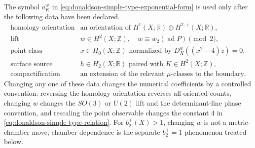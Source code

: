 \begin{definition}
\label{def:donaldson-simple-type-normalization-convention}
The symbol \(a_K^w\) in
\eqref{eq:donaldson-simple-type-exponential-form} is used only after the
following data have been declared.
\[
\begin{array}{ll}
  \text{homology orientation} &
  \text{an orientation of }H^1(X;\mathbb R)\oplus H^{2,+}(X;\mathbb R),\\[1mm]
  \text{lift} &
  w\in H^2(X;\mathbb Z),\quad w\equiv w_2(\operatorname{ad}P)\pmod2,\\[1mm]
  \text{point class} &
  x\in H_0(X;\mathbb Z)\text{ normalized by }D_X^w((x^2-4)z)=0,\\[1mm]
  \text{surface source} &
  h\in H_2(X;\mathbb R)\text{ paired with }K\in H^2(X;\mathbb Z),\\[1mm]
  \text{compactification} &
  \text{an extension of the relevant }\mu\text{-classes to the boundary.}
\end{array}
\]
Changing any one of these data changes the numerical coefficients by a
controlled convention: reversing the homology orientation reverses all
oriented counts, changing \(w\) changes the \(SO(3)\) or \(U(2)\) lift and
the determinant-line phase convention, and rescaling the point observable
changes the constant \(4\) in \eqref{eq:donaldson-simple-type-relation}.  For
\(b_2^+(X)>1\), changing \(w\) is not a metric-chamber move; chamber
dependence is the separate \(b_2^+=1\) phenomenon treated below.
\end{definition}

